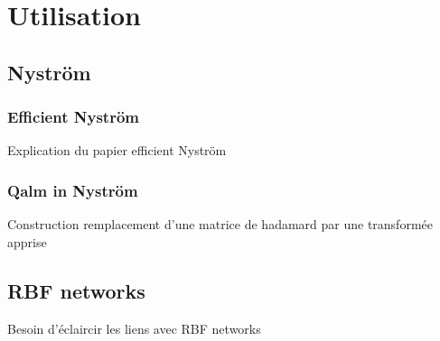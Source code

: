 \documentclass{article}
\begin{document}
\section{Utilisation}
\label{sec:uses}

\subsection{Nyström}

\subsubsection{Efficient Nyström}

Explication du papier efficient Nyström

\subsubsection{Qalm in Nyström}

Construction remplacement d'une matrice de hadamard par une transformée apprise

\subsection{RBF networks}

Besoin d'éclaircir les liens avec RBF networks

%
%
\end{document}
